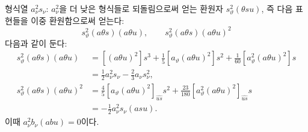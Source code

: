 
형식열 $a_\nu^2s_\nu$: $a_\nu^2$을 더 낮은 형식들로 되돌림으로써 얻는 환원자 $s_\vartheta^2(\theta su)$, 즉 다음 표현들을 이중 환원함으로써 얻는다:
\[
s_\vartheta^2(a\theta s)(a\theta u),\qquad
s_\vartheta^2(a\theta s)(a\theta u)^2
\]
다음과 같이 둔다:
\[
\begin{aligned}
s_\vartheta^2(a\theta s)(a\theta u)
&=[(a\theta u)^2]s^3+\frac15[a_\vartheta(a\theta u)^2]s^2+\frac1{60}[a_\vartheta^2(a\theta u)^2]s\\
&=\frac12a_\nu^2s_\nu-\frac23a_\nu s_\nu^2,\\
s_\vartheta^2(a\theta s)(a\theta u)^2
&=\frac45[a_\vartheta(a\theta u)^2]_{\widehat{us}}s^2+\frac{23}{180}[a_\vartheta^2(a\theta u)^2]_{\widehat{us}}s\\
&=-\frac12a_\nu^2s_\nu(asu).
\end{aligned}
\]
이때 $a_\nu^2b_\nu(abu)=0$이다.
